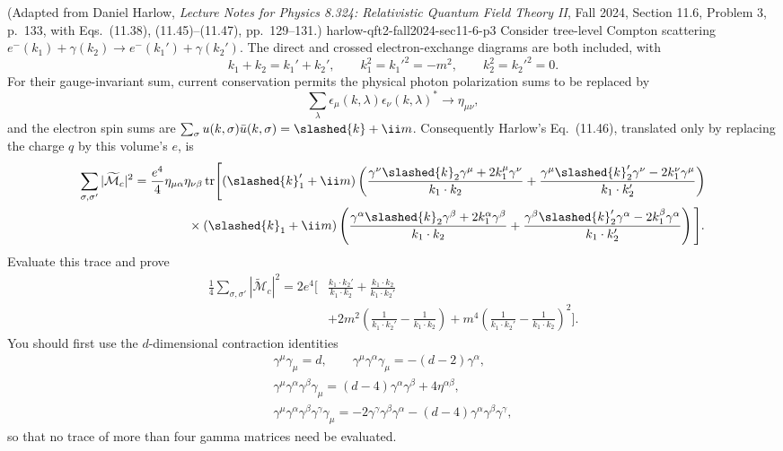 \begin{enumerate}
  {(Adapted from Daniel Harlow, \emph{Lecture Notes for Physics 8.324: Relativistic Quantum Field Theory II}, Fall 2024, Section 11.6, Problem 3, p.~133, with Eqs.~(11.38), (11.45)--(11.47), pp.~129--131.)}
  {harlow-qft2-fall2024-sec11-6-p3}
Consider tree-level Compton scattering
\(e^-(k_1)+\gamma(k_2)\to e^-(k_1')+\gamma(k_2')\).  The direct and crossed
electron-exchange diagrams are both included, with
\[
 k_1+k_2=k_1'+k_2',\qquad
 k_1^2=k_1'^2=-m^2,\qquad k_2^2=k_2'^2=0.
\]
For their gauge-invariant sum, current conservation permits the physical
photon polarization sums to be replaced by
\[
 \sum_\lambda\epsilon_\mu(k,\lambda)
 \epsilon_\nu(k,\lambda)^*\longrightarrow\eta_{\mu\nu},
\]
and the electron spin sums are
\(\sum_\sigma u(k,\sigma)\bar u(k,\sigma)=\slashed{k}+\ii m\).
Consequently Harlow's Eq.~(11.46), translated only by replacing the charge
\(q\) by this volume's \(e\), is
\[
\begin{split}
 \sum_{\sigma,\sigma'}|\widetilde{\mathcal M}_{c}|^2
={}&\frac{e^4}{4}\eta_{\mu\alpha}\eta_{\nu\beta}
 \operatorname{tr}\!\Bigg[(\slashed{k}_1'+\ii m)
 \left(
 \frac{\gamma^\nu\slashed{k}_2\gamma^\mu
       +2k_1^\mu\gamma^\nu}{k_1\cdot k_2}
 +\frac{\gamma^\mu\slashed{k}_2'\gamma^\nu
       -2k_1^\nu\gamma^\mu}{k_1\cdot k_2'}
 \right)\\
 &\qquad\quad\times(\slashed{k}_1+\ii m)
 \left(
 \frac{\gamma^\alpha\slashed{k}_2\gamma^\beta
       +2k_1^\alpha\gamma^\beta}{k_1\cdot k_2}
 +\frac{\gamma^\beta\slashed{k}_2'\gamma^\alpha
       -2k_1^\beta\gamma^\alpha}{k_1\cdot k_2'}
 \right)\Bigg].
\end{split}
\]
Evaluate this trace and prove
\[
 \begin{split}
 \frac14\sum_{\sigma,\sigma'}|\widetilde{\mathcal M}_{c}|^2
 =2e^4\Bigg[&
 \frac{k_1\cdot k_2'}{k_1\cdot k_2}
 +\frac{k_1\cdot k_2}{k_1\cdot k_2'}\\
 &+2m^2\left(\frac1{k_1\cdot k_2'}-\frac1{k_1\cdot k_2}\right)
 +m^4\left(\frac1{k_1\cdot k_2'}-\frac1{k_1\cdot k_2}\right)^2
 \Bigg].
 \end{split}
\]
You should first use the \(d\)-dimensional contraction identities
\[
\begin{gathered}
 \gamma^\mu\gamma_\mu=d,\qquad
 \gamma^\mu\gamma^\alpha\gamma_\mu=-(d-2)\gamma^\alpha,\\
 \gamma^\mu\gamma^\alpha\gamma^\beta\gamma_\mu
 =(d-4)\gamma^\alpha\gamma^\beta+4\eta^{\alpha\beta},\\
 \gamma^\mu\gamma^\alpha\gamma^\beta\gamma^\gamma\gamma_\mu
 =-2\gamma^\gamma\gamma^\beta\gamma^\alpha
 -(d-4)\gamma^\alpha\gamma^\beta\gamma^\gamma,
\end{gathered}
\]
so that no trace of more than four gamma matrices need be evaluated.


\end{enumerate}
